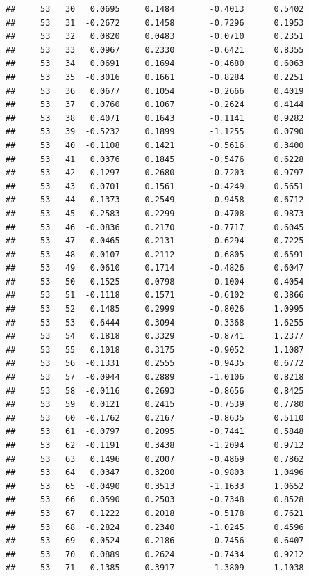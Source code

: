 \documentclass[
]{article}
\begin{document}
\begin{verbatim}
##     53   30   0.0695     0.1484       -0.4013      0.5402  
##     53   31  -0.2672     0.1458       -0.7296      0.1953  
##     53   32   0.0820     0.0483       -0.0710      0.2351  
##     53   33   0.0967     0.2330       -0.6421      0.8355  
##     53   34   0.0691     0.1694       -0.4680      0.6063  
##     53   35  -0.3016     0.1661       -0.8284      0.2251  
##     53   36   0.0677     0.1054       -0.2666      0.4019  
##     53   37   0.0760     0.1067       -0.2624      0.4144  
##     53   38   0.4071     0.1643       -0.1141      0.9282  
##     53   39  -0.5232     0.1899       -1.1255      0.0790  
##     53   40  -0.1108     0.1421       -0.5616      0.3400  
##     53   41   0.0376     0.1845       -0.5476      0.6228  
##     53   42   0.1297     0.2680       -0.7203      0.9797  
##     53   43   0.0701     0.1561       -0.4249      0.5651  
##     53   44  -0.1373     0.2549       -0.9458      0.6712  
##     53   45   0.2583     0.2299       -0.4708      0.9873  
##     53   46  -0.0836     0.2170       -0.7717      0.6045  
##     53   47   0.0465     0.2131       -0.6294      0.7225  
##     53   48  -0.0107     0.2112       -0.6805      0.6591  
##     53   49   0.0610     0.1714       -0.4826      0.6047  
##     53   50   0.1525     0.0798       -0.1004      0.4054  
##     53   51  -0.1118     0.1571       -0.6102      0.3866  
##     53   52   0.1485     0.2999       -0.8026      1.0995  
##     53   53   0.6444     0.3094       -0.3368      1.6255  
##     53   54   0.1818     0.3329       -0.8741      1.2377  
##     53   55   0.1018     0.3175       -0.9052      1.1087  
##     53   56  -0.1331     0.2555       -0.9435      0.6772  
##     53   57  -0.0944     0.2889       -1.0106      0.8218  
##     53   58  -0.0116     0.2693       -0.8656      0.8425  
##     53   59   0.0121     0.2415       -0.7539      0.7780  
##     53   60  -0.1762     0.2167       -0.8635      0.5110  
##     53   61  -0.0797     0.2095       -0.7441      0.5848  
##     53   62  -0.1191     0.3438       -1.2094      0.9712  
##     53   63   0.1496     0.2007       -0.4869      0.7862  
##     53   64   0.0347     0.3200       -0.9803      1.0496  
##     53   65  -0.0490     0.3513       -1.1633      1.0652  
##     53   66   0.0590     0.2503       -0.7348      0.8528  
##     53   67   0.1222     0.2018       -0.5178      0.7621  
##     53   68  -0.2824     0.2340       -1.0245      0.4596  
##     53   69  -0.0524     0.2186       -0.7456      0.6407  
##     53   70   0.0889     0.2624       -0.7434      0.9212  
##     53   71  -0.1385     0.3917       -1.3809      1.1038  

\end{verbatim}
\end{document}
